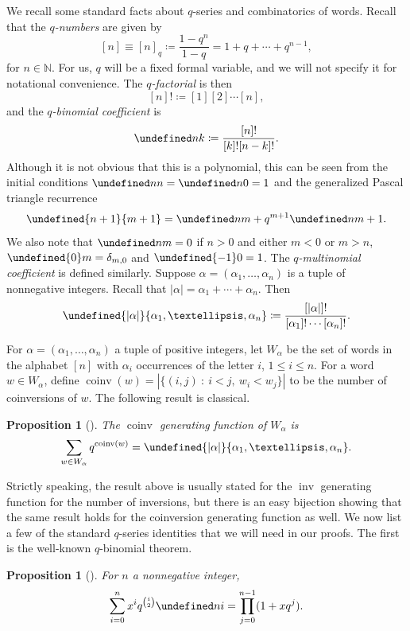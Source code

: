 \documentclass[11pt]{article}
\newtheorem{proposition}[theo]{Proposition}
\theoremstyle{definition}
\providecommand{\qbinom}[2]{\genfrac{[}{]}{0pt}{}{#1}{#2}}
\numberwithin{equation}{section}
\DeclareMathOperator{\inv}{inv}
\DeclareMathOperator{\coinv}{coinv}
\let\qbinom\undefined
\newcommand{\qbinom}[2]{\bgroup\renewcommand*{\arraystretch}{1}\begin{bmatrix} #1 \\ #2\end{bmatrix} \egroup}
\begin{document}
We recall some standard facts about $q$-series and combinatorics of words. 
Recall that the {\em $q$-numbers} are given by 
\[
[n] \equiv [n]_q \coloneqq \frac{1-q^n}{1-q} = 1 + q + \cdots + q^{n-1}, 
\]
for $n \in \mathbb{N}$. For us, $q$ will be a fixed formal variable,
and we will not specify it for notational convenience.
The {\em $q$-factorial} is then
\[
[n]! \coloneqq [1] [2] \cdots [n],
\]
and the {\em $q$-binomial coefficient} is
\[
\qbinom nk \coloneqq \frac{[n]!}{[k]! [n-k]!}.
\]
Although it is not obvious that this is a polynomial, this can be seen
from the initial conditions $\qbinom nn = \qbinom n0 = 1$
and the generalized Pascal triangle recurrence
\begin{equation}
\label{qbinom-recur}
\qbinom {n+1}{m+1} = \qbinom nm + q^{m+1} \qbinom n{m+1}.
\end{equation}
We also note that $\qbinom nm = 0$ if $n > 0$ and either $m < 0$ or $m > n$, $\qbinom {0}m = \delta_{m,0}$ and $\qbinom {-1}0 = 1$.
The  {\em $q$-multinomial coefficient} is defined similarly. Suppose 
$\alpha = (\alpha_1,\dots, \allowbreak \alpha_n)$ is a tuple of nonnegative integers.
Recall that $|\alpha| = \alpha_1 + \cdots + \alpha_n$. Then
\[
\qbinom{|\alpha|}{\alpha_1,\dots,\alpha_n} \coloneqq \frac{[|\alpha|]!}{[\alpha_1]! \cdots [\alpha_n]!}.
\]


For $\alpha = (\alpha_1,\dots, \alpha_n)$ a tuple of positive integers, let $W_\alpha$
be the set of words in the alphabet $[n]$ with $\alpha_i$ occurrences of the letter $i$,
$1 \leq i \leq n$. For a word $w\in W_{\alpha}$, define $\coinv(w) = |\{(i,j)\ :\ i<j,\ w_i<w_j\}|$ to be the number of coinversions of $w$. The following result is classical.

\begin{proposition}[{\cite[Proposition 1.7.1]{stanley-ec1}}]
\label{prop:coinv-gf}
The $\coinv$ generating function of $W_\alpha$ is
\[
\sum_{w \in W_\alpha} q^{\coinv(w)} = \qbinom{|\alpha|}{\alpha_1,\dots,\alpha_n}.
\]
\end{proposition}

Strictly speaking, the result above is usually stated for the $\inv$ generating function for the number of inversions, but there is an easy bijection showing that the same result holds for the coinversion generating function as well.
We now list a few of the standard $q$-series identities that we will need in our proofs. The first is the 
well-known $q$-binomial theorem.

\begin{proposition}[{\cite[Equation (1.87)]{stanley-ec1}}]
\label{prop:qbinom}
For $n$ a nonnegative integer,
\[
\sum_{i=0}^n x^i q^{\binom{i}{2}} \qbinom ni = \prod_{j=0}^{n-1} (1 + x q^j).
\]
\end{proposition}
\end{document}
